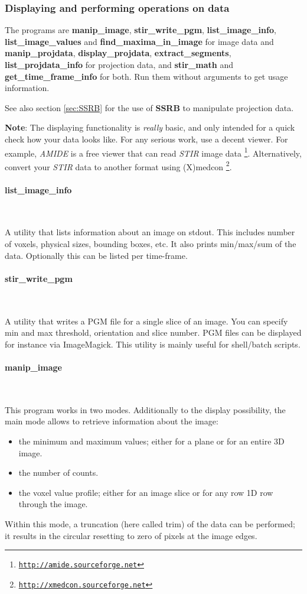 \documentclass{article}
\def\url#1#2{\mbox{\href{#1}{\tt #2}}}
\newcommand{\subsubsubsection}[1]{\paragraph{#1}\mbox{} \\}
\begin{document}
\subsubsection{
Displaying and performing operations on data}

The programs are \textbf{manip\_image}, \textbf{stir\_write\_pgm}, \textbf{list\_image\_info}, 
\textbf{list\_image\_values} and \textbf{find\_maxima\_in\_image}
for image data and \textbf{manip\_projdata}, 
 \textbf{display\_projdata}, \textbf{extract\_segments}, 
\textbf{list\_projdata\_info} for 
projection data, and \textbf{stir\_math} and \textbf{get\_time\_frame\_info} for both.
Run them without arguments to get usage information.

See also section \ref{sec:SSRB} for the use of \textbf{SSRB} to manipulate projection 
data.

\textbf{Note}: The displaying functionality is \textit{really} basic, and 
only intended for a quick check how your data looks like. For 
any serious work, use a decent viewer. For example, \textit{AMIDE} 
is a free viewer that can read \textit{STIR} image data
\footnote{\url{http://amide.sourceforge.net }{http://amide.sourceforge.net}}. Alternatively, 
convert your \textit{STIR} data to another format using (X)medcon
\footnote{\url{http://xmedcon.sourceforge.net }{http://xmedcon.sourceforge.net}}.

{ \subsubsubsection{list\_image\_info}
}

A utility that lists information about an image on stdout. This includes number of voxels,
physical sizes, bounding boxes, etc. It also prints min/max/sum of the data. 
Optionally this can be listed per time-frame.

{ \subsubsubsection{stir\_write\_pgm}
}

A utility that writes a PGM file for a single slice of an image. You can specify min and max threshold,
orientation and slice number. PGM files can be displayed for instance via ImageMagick.
This utility is mainly useful for shell/batch scripts.

{ \subsubsubsection{manip\_image}
}

This program works in two modes. Additionally to the display 
possibility, the main mode allows to retrieve information about 
the image:

\begin{itemize}
\item the minimum and maximum values; either for a plane or for an 
entire 3D image.
\item the number of counts.
\item the voxel value profile; either for an image slice or for any 
row 1D row through the image.
\end{itemize}
Within this mode, a truncation (here called trim) of the data 
can be performed; it results in the circular resetting to zero 
of pixels at the image edges.
\end{document}
